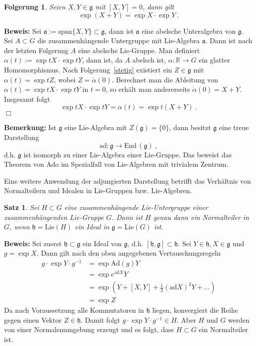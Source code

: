 \documentclass[12pt,a4paper]{article}
\def\R{\mathbb{R}}
\def\Ad{\mathrm{Ad}}
\def\ad{\mathrm{ad}}
\def\End{\mathrm{End}\,}
\def\Lie{\mathrm{Lie}}
\def\g{\mathfrak{g}}
\def\h{\mathfrak{h}}
\def\ad{\mathrm{ad}}
\newtheorem{Satz}[Lemma]{Satz}
\newtheorem{Folgerung}[Lemma]{Folgerung}
\def\proof{\noindent\textbf{Beweis:}\quad}
\def\qed{\quad\hfill\ensuremath{\Box}}
\begin{document}
\begin{Folgerung}
Seien $X,Y \in \g$  mit $[X,Y]=0$, dann gilt
$$
\exp(X+Y)= \exp X \cdot \exp Y \ .
$$
\end{Folgerung}
\proof
Sei $\mathfrak{a} := \mathrm{span} \{X, Y\} \subset \g$, dann ist $\mathfrak{a}$ eine
abelsche Unteralgebra von $\g$. Sei $A\subset G$ die zusammenh\"angende Untergruppe mit
Lie-Algebra $\mathfrak{a}$. Dann ist nach der letzten Folgerung $A$ eine abelsche
Lie-Gruppe. Man definiert $\alpha(t):= \exp tX \cdot \exp tY$, dann ist, da $A$ abelsch ist,
$\alpha : \R \rightarrow G$ ein glatter Homomorphismus. Nach Folgerung~\ref{stetig}
existiert ein $Z\in \g$ mit $\alpha(t) = \exp tZ$, wobei $Z= \dot \alpha(0)$. Berechnet
man die Ableitung von $\alpha(t)= \exp tX \cdot \exp tY$ in $t=0$, so erh\"alt man
andererseits $\dot \alpha(0) = X + Y$. Insgesamt folgt
$$
\exp tX \cdot \exp tY = \alpha (t) = \exp t(X+Y) \ .
$$
\qed

\bigskip

{\bf Bemerkung:}
Ist $\g$ eine Lie-Algebra mit $Z(\g)= \{0\}$, dann besitzt $\g$ eine treue Darstellung
$$
\ad : \g \rightarrow \End(\g) \ ,
$$
d.h. $\g$ ist isomorph zu einer Lie-Algebra einer Lie-Gruppe. Das beweist das Theorem
von Ado im Spezialfall von Lie-Algebren mit trivialem Zentrum.

\bigskip

Eine weitere Anwendung der adjungierten Darstellung betrifft das Verh\"altnis von Normalteilern
und Idealen in Lie-Gruppen bzw. Lie-Algebren.

\medskip

\begin{Satz}
Sei $H \subset G$ eine zusammenh\"angende Lie-Untergruppe einer zusammenh\"angenden Lie-Gruppe
$G$. Dann ist $H$ genau dann ein Normalteiler in $G$, wenn $\h= \Lie(H)$ ein Ideal in
$\g = \Lie(G)$ ist.
\end{Satz}
\proof
Sei zuerst $\h\subset \g$ ein Ideal von $\g$, d.h. $[\h, \g] \subset \h$. Sei $Y\in \h, X\in \g$ und
$g= \exp X$. Dann gilt nach den oben angegebenen Vertauschungsregeln
$$
\begin{array}{rl}
g \cdot \exp Y \cdot g^{-1} &= \exp \Ad(g) Y \\[1.5ex]
&=
\exp e^{\ad X} Y \\[1.5ex]
&=
\exp (Y + [X, Y] + \tfrac12 (\ad X)^2Y + \ldots ) \\[1.5ex]
&=
\exp Z
\end{array}
$$
Da nach Voraussetzung alle Kommutatoren in $\h$ liegen, konvergiert die Reihe gegen
einen Vektor $Z\in \h$. Damit folgt $g \cdot \exp Y \cdot g^{-1}\in H$. Aber $H$ und
$G$ werden von einer Normalenumgebung erzeugt und es folgt, dass $H\subset G$
ein Normalteiler ist.
\end{document}
